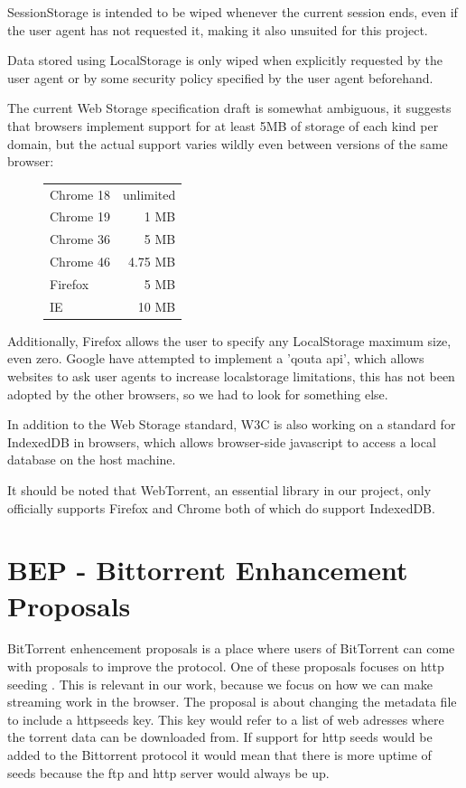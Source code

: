 SessionStorage is intended to be wiped whenever the current session ends, 
even if the user agent has not requested it, making it also unsuited for this project.

Data stored using LocalStorage is only wiped when explicitly requested by the user agent or 
by some security policy specified by the user agent beforehand.
\newline

The current Web Storage specification draft is somewhat ambiguous, 
it suggests that browsers implement support for at least 5MB of storage of each kind per domain,
but the actual support varies wildly even between versions of the same browser:

\begin{figure}[h]
	\begin{tabular}{l | r}
		Chrome 18 & unlimited \\
		Chrome 19 & 1    MB   \\
		Chrome 36 & 5    MB   \\
		Chrome 46 & 4.75 MB   \\
		Firefox   & 5    MB   \\
		IE        & 10   MB   \\
	\end{tabular}
\end{figure}

Additionally, Firefox allows the user to specify any LocalStorage maximum size, even zero. 
Google have attempted to implement a 'qouta api', 
which allows websites to ask user agents to increase localstorage limitations,
this has not been adopted by the other browsers, so we had to look for something else.
\newline

In addition to the Web Storage standard, W3C is also working on a standard for IndexedDB in browsers, 
which allows browser-side javascript to access a local database on the host machine.

It should be noted that WebTorrent, 
an essential library in our project, 
only officially supports Firefox and Chrome 
both of which do support IndexedDB.
\newline

\section{BEP - Bittorrent Enhancement Proposals}
BitTorrent enhencement proposals is a place where users of BitTorrent can come with proposals to improve the protocol.
One of these proposals focuses on http seeding \citep{bittorrent:bep17}.
This is relevant in our work, because we focus on how we can make streaming work in the browser. The proposal is about changing the metadata file to include a httpseeds key. This key would refer to a list of web adresses where the torrent data can be downloaded from.
If support for http seeds would be added to the Bittorrent protocol it would mean that there is more uptime of seeds because the ftp and http server would always be up.

